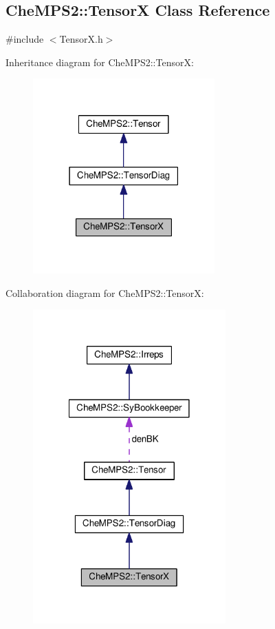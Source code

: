 \hypertarget{classCheMPS2_1_1TensorX}{\subsection{Che\-M\-P\-S2\-:\-:Tensor\-X Class Reference}
\label{classCheMPS2_1_1TensorX}
}


{\ttfamily \#include $<$Tensor\-X.\-h$>$}



Inheritance diagram for Che\-M\-P\-S2\-:\-:Tensor\-X\-:\nopagebreak
\begin{figure}[H]
\begin{center}
\leavevmode
\includegraphics[width=198pt]{classCheMPS2_1_1TensorX__inherit__graph}
\end{center}
\end{figure}


Collaboration diagram for Che\-M\-P\-S2\-:\-:Tensor\-X\-:\nopagebreak
\begin{figure}[H]
\begin{center}
\leavevmode
\includegraphics[width=210pt]{classCheMPS2_1_1TensorX__coll__graph}
\end{center}
\end{figure}
